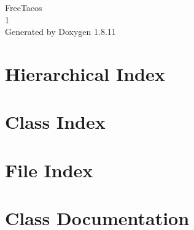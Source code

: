 \documentclass[twoside]{book}
\newcommand{\+}{\discretionary{\mbox{\scriptsize$\hookleftarrow$}}{}{}}
\newcommand{\clearemptydoublepage}{%
  \newpage{\pagestyle{empty}\cleardoublepage}%
}
\begin{document}
\hypersetup{pageanchor=false,
             bookmarksnumbered=true,
             pdfencoding=unicode
            }
\begin{titlepage}
\vspace*{7cm}
\begin{center}%
{\Large Free\+Tacos \\[1ex]\large 1 }\\
\vspace*{1cm}
{\large Generated by Doxygen 1.8.11}\\
\end{center}
\end{titlepage}
\clearemptydoublepage
\tableofcontents
\clearemptydoublepage
{}
\hypersetup{pageanchor=true}

\chapter{Hierarchical Index}

\chapter{Class Index}

\chapter{File Index}

\chapter{Class Documentation}











































\end{document}
